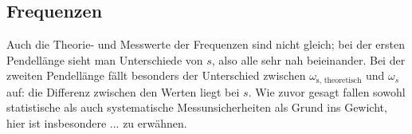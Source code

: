 \subsection{Frequenzen}
Auch die Theorie- und Messwerte der Frequenzen sind nicht gleich; bei der ersten Pendellänge sieht man Unterschiede von $ s$, also alle sehr nah beieinander. Bei
der zweiten Pendellänge fällt besonders der Unterschied zwischen $\omega_\text{s, theoretisch}$ und $\omega_{s}$ auf: die Differenz zwischen den Werten liegt bei
$ s$. Wie zuvor gesagt fallen sowohl statistische als auch systematische Messunsicherheiten als Grund ins Gewicht, hier ist insbesondere ... zu erwähnen.